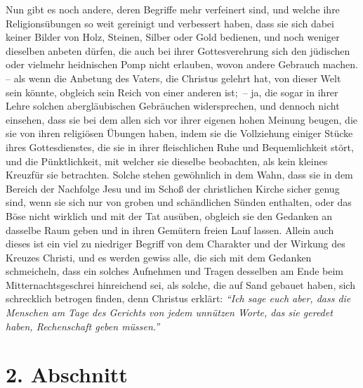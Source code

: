 Nun gibt es noch andere, deren Begriffe mehr
verfeinert sind, und welche ihre
Religionsübungen so weit
gereinigt und verbessert haben, dass sie sich dabei keiner Bilder von Holz,
Steinen, Silber oder Gold bedienen,
und noch weniger dieselben anbeten dürfen, die auch bei ihrer Gottesverehrung
sich den jüdischen oder vielmehr heidnischen Pomp nicht
erlauben, wovon andere
Gebrauch
machen.  -- als wenn die Anbetung des Vaters, die Christus
gelehrt hat, von
dieser Welt sein könnte, obgleich sein Reich von einer anderen ist;~-- ja, die
sogar in ihrer Lehre solchen abergläubischen Gebräuchen widersprechen, und
dennoch nicht einsehen, dass sie bei dem allen sich vor ihrer eigenen hohen
Meinung beugen, die sie von ihren religiösen Übungen haben, indem sie die
Vollziehung einiger Stücke ihres Gottesdienstes, die sie in ihrer fleischlichen
Ruhe und Bequemlichkeit stört, und die Pünktlichkeit, mit
welcher sie dieselbe
beobachten, als
kein kleines Kreuzfür sie betrachten. Solche stehen
gewöhnlich in dem Wahn,
dass sie in dem Bereich der Nachfolge Jesu und im Schoß der christlichen
Kirche sicher genug sind, wenn sie sich nur von groben und schändlichen Sünden
enthalten, oder das Böse
nicht wirklich und mit der Tat ausüben, obgleich sie
den Gedanken an dasselbe Raum geben und in ihren Gemütern freien Lauf lassen.
Allein auch dieses ist ein viel zu niedriger Begriff von dem Charakter und der
Wirkung des Kreuzes Christi, und es werden gewiss alle, die sich mit dem
Gedanken schmeicheln, dass ein solches Aufnehmen und Tragen desselben am Ende
beim Mitternachtsgeschrei
hinreichend sei, als
solche, die auf Sand
gebauet haben, sich schrecklich betrogen finden, denn Christus erklärt:
\textit{"`Ich sage euch aber, dass die Menschen am Tage des Gerichts von jedem
unnützen Worte, das sie geredet haben, Rechenschaft geben
müssen."'}

\section{2. Abschnitt} \label{kap6_ab2}

